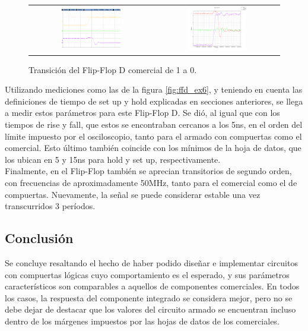 \begin{figure}[H]
    \centering
    \begin{tabular}{c c}
        \includegraphics[width=0.5\textwidth]{../EJ6/Recursos/com_ffd_fall_osc} &
        \includegraphics[width=0.5\textwidth]{../EJ6/Recursos/com_ffd_fall}
    \end{tabular}
    \caption{Transición del Flip-Flop D comercial de 1 a 0.}
    \label{fig:com_ffd_fall_ex6}
\end{figure}

Utilizando mediciones como las de la figura \ref{fig:ffd_ex6}, y teniendo en cuenta las definiciones de tiempo de set up y hold explicadas en secciones anteriores, se 
llega a medir estos parámetros para este Flip-Flop D.
Se dió, al igual que con los tiempos de rise y fall, que estos se encontraban cercanos a los 5ns, en el orden del límite impuesto por el osciloscopio, tanto para el armado 
con compuertas como el comercial.
Esto último también coincide con los mínimos de la hoja de datos, que los ubican en 5 y 15ns para hold y set up, respectivamente.\\
Finalmente, en el Flip-Flop también se aprecian transitorios de segundo orden, con frecuencias de aproximadamente 50MHz, tanto para el comercial como el de compuertas.
Nuevamente, la señal se puede considerar estable una vez transcurridos 3 períodos.



\subsection{Conclusión}
Se concluye resaltando el hecho de haber podido diseñar e implementar circuitos con compuertas lógicas cuyo comportamiento es el esperado, y sus parámetros 
característicos son comparables a aquellos de componentes comerciales.
En todos los casos, la respuesta del componente integrado se considera mejor, pero no se debe dejar de destacar que los valores del circuito armado se encuentran incluso 
dentro de los márgenes impuestos por las hojas de datos de los comerciales.